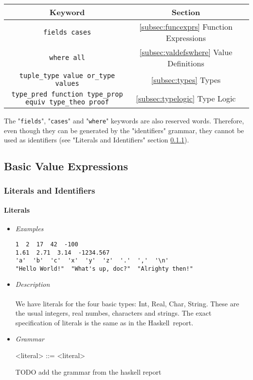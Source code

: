 \documentclass{article}
\def\H{Haskell}
\begin{document}
\begin{center}
\begin{tabular}{ |c|c|c| } 
\hline
Keyword & Section \\ 
\hline
\hline
\texttt{fields cases} & \ref{subsec:funcexprs} Function Expressions \\
\hline
\texttt{where all} & \ref{subsec:valdefswhere} Value Definitions \\
\hline
\texttt{tuple_type value or_type values} & \ref{subsec:types} Types \\
\hline
\texttt{type_pred function type_prop equiv type_theo proof} &
  \ref{subsec:typelogic} Type Logic \\
\hline
\end{tabular}
\end{center}
The "\texttt{fields}", "\texttt{cases}" and "\texttt{where}" keywords are also
reserved words. Therefore, even though they can be generated by the
"identifiers" grammar, they cannot be used as identifiers (see "Literals and
Identifiers" section \ref{subsubsec:litsandidents}).

\subsection{Basic Value Expressions}

\subsubsection{Literals and Identifiers}
\label{subsubsec:litsandidents}

\paragraph{Literals}
\begin{itemize}

\item \textit{Examples}
\begin{verbatim}
1  2  17  42  -100
1.61  2.71  3.14  -1234.567
'a'  'b'  'c'  'x'  'y'  'z'  '.'  ','  '\n'
"Hello World!"  "What's up, doc?"  "Alrighty then!"
\end{verbatim}

\item \textit{Description} \\\\
We have literals for the four basic types: Int, Real, Char, String. These are the 
usual integers, real numbes, characters and strings. The exact specification of 
literals is the same as in the \H\ report.

\item \textit{Grammar}
\begin{grammar}
<literal> ::= <literal>
\end{grammar}
TODO add the grammar from the haskell report

\end{itemize}
\end{document}
